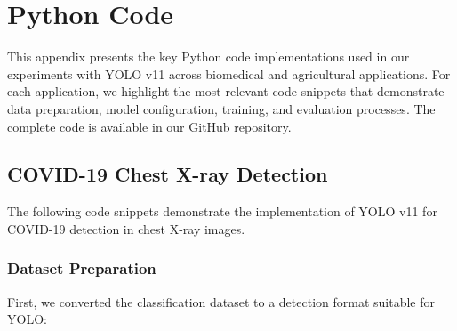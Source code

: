 \appendix
\section{Python Code}
\label{appendix:code}

This appendix presents the key Python code implementations used in our experiments with YOLO v11 across biomedical and agricultural applications. For each application, we highlight the most relevant code snippets that demonstrate data preparation, model configuration, training, and evaluation processes. The complete code is available in our GitHub repository.

\subsection{COVID-19 Chest X-ray Detection}
\label{appendix:covid-code}

The following code snippets demonstrate the implementation of YOLO v11 for COVID-19 detection in chest X-ray images.

\subsubsection{Dataset Preparation}
First, we converted the classification dataset to a detection format suitable for YOLO:

